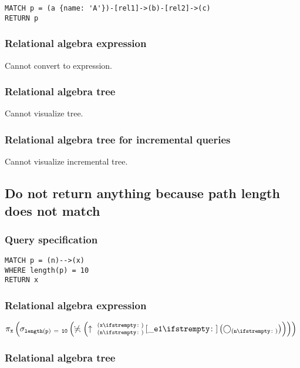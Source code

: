 \begin{lstlisting}
MATCH p = (a {name: 'A'})-[rel1]->(b)-[rel2]->(c)
RETURN p
\end{lstlisting}

\subsubsection*{Relational algebra expression}

Cannot convert to expression.

\subsubsection*{Relational algebra tree}

Cannot visualize tree.

\subsubsection*{Relational algebra tree for incremental queries}

Cannot visualize incremental tree.

\subsection{Do not return anything because path length does not match}

\subsubsection*{Query specification}

\begin{lstlisting}
MATCH p = (n)-->(x)
WHERE length(p) = 10
RETURN x
\end{lstlisting}

\subsubsection*{Relational algebra expression}

$\projection{\var{x}} \left(\selection{\mathtt{length(p)~=~10}} \left(\alldifferent{} \left(\expandout{n}{x}{}{\_e1}{} \left(\getvertices{n}{}\right)\right)\right)\right)$

\subsubsection*{Relational algebra tree}

